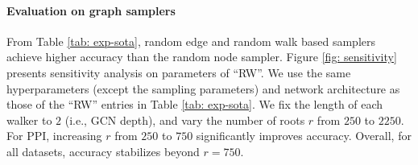 







\paragraph{Evaluation on graph samplers} From Table \ref{tab: exp-sota}, random edge and random walk based samplers achieve higher accuracy than the random node sampler. Figure \ref{fig: sensitivity} presents sensitivity analysis on parameters of ``RW''. We use the same hyperparameters (except the sampling parameters) and network architecture as those of the ``RW'' entries in  Table \ref{tab: exp-sota}. We fix the length of each walker to $2$ (i.e., GCN depth), and vary the number of roots $r$ from $250$ to $2250$. For PPI, increasing $r$ from $250$ to $750$ significantly improves accuracy. Overall, for all datasets, accuracy stabilizes beyond $r=750$. 



